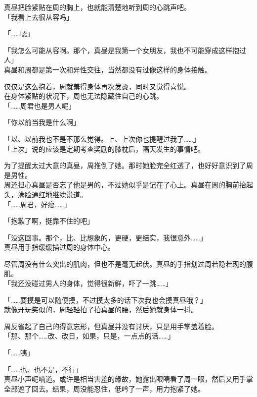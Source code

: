 真昼把脸紧贴在周的胸上，也就能清楚地听到周的心跳声吧。\\

「我看上去很从容吗」

「……嗯」

「我怎么可能从容啊。那个，真昼是我第一个女朋友，我也不可能穿成这样抱过人」\\

真昼和周都是第一次和异性交往，当然都没有过像这样的身体接触。

仅仅是这么抱着，周就羞得身体再次发烫，同时又觉得喜悦。\\

在身体紧贴的状况下，周也无法隐藏住自己的心跳。\\

「……周君也是男人呢」

「你以前当我是什么啊」

「以、以前我也不是不那么觉得。上、上次你也提醒过我了……」\\

「上次」说的应该是定期考查奖励的膝枕后，隔天发生的事情吧。

为了提醒太过大意的真昼，周推倒了她。那时她脸完全红透了，也好好意识到了周是男性。\\

周还担心真昼是否忘了他是男的，不过她似乎是记在了心上。真昼在周的胸前抬起头，满脸通红地继续说道。\\

「……周君，好瘦……」

「抱歉了啊，挺靠不住的吧」

「没这回事。那个，比、比想象的，更硬，更结实，我很意外……」\\

真昼用手指缓缓描过周的身体中心。

尽管周没有什么突出的肌肉，但也不是毫无起伏。真昼的手指划过周若隐若现的腹肌。\\

「我还没碰过男人的身体，觉得很新鲜，吓了一跳……」

「……要摸是可以随便摸，不过摸太多的话下次我也会摸真昼哦？」\\

就像开玩笑似的，周轻轻拍了拍真昼的腰，然后她就身体一抖。

周反省起了自己的得意忘形，但真昼并没有讨厌，只是用手掌盖着脸。\\

「那、那个……改、改日，如果，只是，一点点的话……」

「……咦」

「……也、也不是，不行」\\

真昼小声呢喃道。或许是相当害羞的缘故，她露出眼睛看了周一眼，然后又用手掌全部遮了回去。结果，周没能忍住，低吟了一声，用力抱紧了她。
